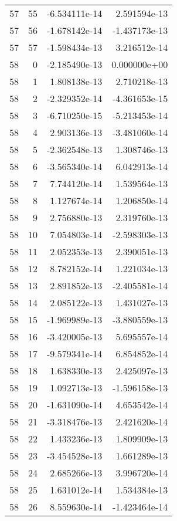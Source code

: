 \begin{tabular}{rrrr}
  57 &   55 & -6.534111e-14 &  2.591594e-13 \\
  57 &   56 & -1.678142e-14 & -1.437173e-13 \\
  57 &   57 & -1.598434e-13 &  3.216512e-14 \\
  58 &    0 & -2.185490e-13 &  0.000000e+00 \\
  58 &    1 &  1.808138e-13 &  2.710218e-13 \\
  58 &    2 & -2.329352e-14 & -4.361653e-15 \\
  58 &    3 & -6.710250e-15 & -5.213453e-14 \\
  58 &    4 &  2.903136e-13 & -3.481060e-14 \\
  58 &    5 & -2.362548e-13 &  1.308746e-13 \\
  58 &    6 & -3.565340e-14 &  6.042913e-14 \\
  58 &    7 &  7.744120e-14 &  1.539564e-13 \\
  58 &    8 &  1.127674e-14 &  1.206850e-14 \\
  58 &    9 &  2.756880e-13 &  2.319760e-13 \\
  58 &   10 &  7.054803e-14 & -2.598303e-13 \\
  58 &   11 &  2.052353e-13 &  2.390051e-13 \\
  58 &   12 &  8.782152e-14 &  1.221034e-13 \\
  58 &   13 &  2.891852e-13 & -2.405581e-14 \\
  58 &   14 &  2.085122e-13 &  1.431027e-13 \\
  58 &   15 & -1.969989e-13 & -3.880559e-13 \\
  58 &   16 & -3.420005e-13 &  5.695557e-14 \\
  58 &   17 & -9.579341e-14 &  6.854852e-14 \\
  58 &   18 &  1.638330e-13 &  2.425097e-13 \\
  58 &   19 &  1.092713e-13 & -1.596158e-13 \\
  58 &   20 & -1.631090e-14 &  4.653542e-14 \\
  58 &   21 & -3.318476e-13 &  2.421620e-14 \\
  58 &   22 &  1.433236e-13 &  1.809909e-13 \\
  58 &   23 & -3.454528e-13 &  1.661289e-13 \\
  58 &   24 &  2.685266e-13 &  3.996720e-14 \\
  58 &   25 &  1.631012e-14 &  1.534384e-13 \\
  58 &   26 &  8.559630e-14 & -1.423464e-14 \\

\end{tabular}
